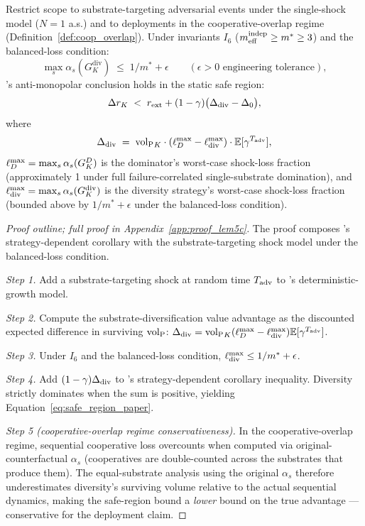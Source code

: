 \addtocounter{lemma}{-1}\renewcommand{\thelemma}{5c}
\begin{lemma}
\label{lem:5c}
Restrict scope to substrate-targeting adversarial events under the
single-shock model ($N = 1$ a.s.) and to deployments in the
cooperative-overlap regime
(Definition~\ref{def:coop_overlap}). Under invariants $I_6$
($m_{\mathrm{eff}}^{\mathrm{indep}} \geq m^* \geq 3$) and the balanced-loss condition:
\[
  \max_s \alpha_s(G_K^{\mathrm{div}}) \;\leq\; 1/m^* + \epsilon
  \qquad (\epsilon > 0 \text{ engineering tolerance}),
\]
\citep[Horizon~Aware]{lasser2026horizon}'s anti-monopolar conclusion holds in the static safe region:
\begin{equation}
\label{eq:safe_region_paper}
  \Delta r_K \;<\; r_{\mathrm{ext}} + (1 - \gamma)\bigl(\Delta_{\mathrm{div}} - \Delta_0\bigr),
\end{equation}
where
\begin{equation}
\label{eq:ddiv_paper}
  \Delta_{\mathrm{div}} \;=\; {\operatorname{vol}_{\mathrm{P}}}_K \cdot (\ell_D^{\max} - \ell_{\mathrm{div}}^{\max}) \cdot
  \mathbb{E}[\gamma^{T_{\mathrm{adv}}}],
\end{equation}
$\ell_D^{\max} = \max_s \alpha_s(G_K^{D})$ is the dominator's
worst-case shock-loss fraction (approximately 1 under full
failure-correlated single-substrate domination), and
$\ell_{\mathrm{div}}^{\max} = \max_s \alpha_s(G_K^{\mathrm{div}})$ is the
diversity strategy's worst-case shock-loss fraction (bounded above
by $1/m^* + \epsilon$ under the balanced-loss condition).
\end{lemma}

\begin{proof}[Proof outline; full proof in
Appendix~\ref{app:proof_lem5c}]
The proof composes \citep[Horizon~Aware]{lasser2026horizon}'s strategy-dependent corollary with the
substrate-targeting shock model under the balanced-loss condition.

\emph{Step 1.} Add a substrate-targeting shock at random time
$T_{\mathrm{adv}}$ to \citep[Horizon~Aware]{lasser2026horizon}'s deterministic-growth model.

\emph{Step 2.} Compute the substrate-diversification value
advantage as the discounted expected difference in surviving
${\operatorname{vol}_{\mathrm{P}}}$:
$\Delta_{\mathrm{div}} = {\operatorname{vol}_{\mathrm{P}}}_K(\ell_D^{\max} - \ell_{\mathrm{div}}^{\max}) \mathbb{E}[\gamma^{T_{\mathrm{adv}}}]$.

\emph{Step 3.} Under $I_6$ and the balanced-loss condition,
$\ell_{\mathrm{div}}^{\max} \leq 1/m^* + \epsilon$.

\emph{Step 4.} Add $(1-\gamma)\Delta_{\mathrm{div}}$ to \citep[Horizon~Aware]{lasser2026horizon}'s strategy-dependent
corollary inequality. Diversity strictly dominates when the sum is
positive, yielding Equation~\ref{eq:safe_region_paper}.

\emph{Step 5 (cooperative-overlap regime conservativeness).}  In
the cooperative-overlap regime, sequential cooperative loss
overcounts when computed via original-counterfactual $\alpha_s$
(cooperatives are double-counted across the substrates that produce
them).  The equal-substrate analysis using the original $\alpha_s$
therefore underestimates diversity's surviving volume relative to
the actual sequential dynamics, making the safe-region bound a
\emph{lower} bound on the true advantage --- conservative for the
deployment claim.
\end{proof}

